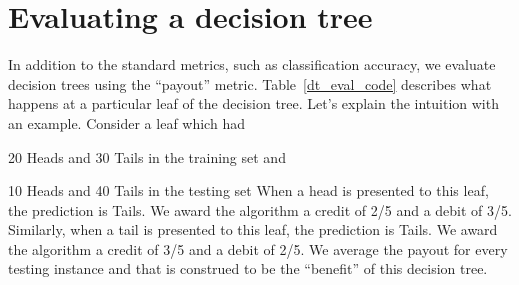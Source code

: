 
\newpage
\section{Evaluating a decision tree}
\label{payout}
In addition to the standard metrics, such as classification accuracy, we
evaluate decision trees using the ``payout'' metric.
Table~\ref{dt_eval_code} describes what happens at a particular leaf of the decision tree. Let's explain the intuition with an example. Consider a leaf which had 
\bi
\item 20 Heads and 30 Tails in the training set and 
\item 10 Heads and 40 Tails in the testing set 
\ei
When a head is presented to this leaf, the prediction is Tails. We award the
algorithm a credit of 2/5 and a debit of 3/5.
Similarly, when a tail is presented to this leaf, the prediction is Tails. We award the
algorithm a credit of 3/5 and a debit of 2/5. We average the payout for every
testing instance and that is construed to be the ``benefit'' of this decision tree.


